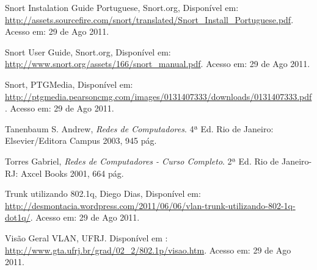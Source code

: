 \documentclass[brazil, ruledheader, pnumromarab,normaltoc]{abnt}
\begin{document}
\begin{thebibliography}{100}
 Snort Instalation Guide Portuguese, Snort.org, Disponível em: \url{http://assets.sourcefire.com/snort/translated/Snort_Install_Portuguese.pdf}. Acesso em: 29 de Ago 2011.

 Snort User Guide, Snort.org, Disponível em: \url{http://www.snort.org/assets/166/snort_manual.pdf}. Acesso em: 29 de Ago 2011.

 Snort, PTGMedia, Disponível em: \url{http://ptgmedia.pearsoncmg.com/images/0131407333/downloads/0131407333.pdf}. Acesso em: 29 de Ago 2011.

 Tanenbaum S. Andrew, \emph{Redes de Computadores}. 4ª Ed. Rio de Janeiro: Elsevier/Editora Campus 2003, 945 pág.

 Torres Gabriel, \emph{Redes de Computadores - Curso Completo}. 2ª Ed. Rio de Janeiro-RJ: Axcel Books 2001, 664 pág.

 Trunk utilizando 802.1q, Diego Dias, Disponível em: \url{http://desmontacia.wordpress.com/2011/06/06/vlan-trunk-utilizando-802-1q-dot1q/}. Acesso em: 29 de Ago 2011.

 Visão Geral VLAN, UFRJ. Disponível em : \url{http://www.gta.ufrj.br/grad/02_2/802.1p/visao.htm}. Acesso em: 29 de Ago 2011.


\end{thebibliography}
\end{document}
